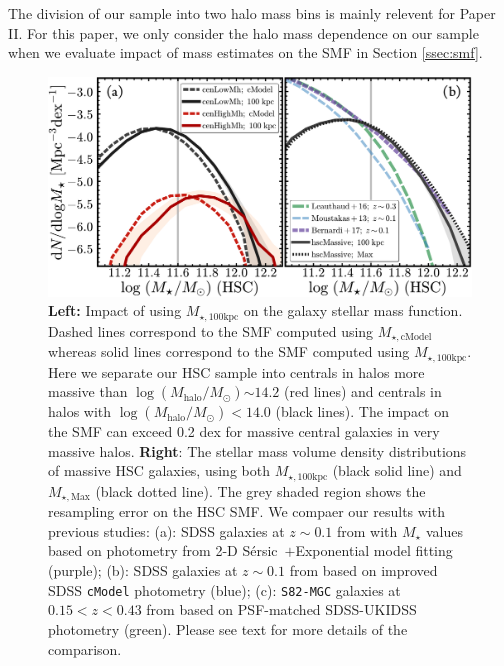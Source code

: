 \documentclass[a4paper,fleqn,usenatbib]{mnras}
\def\ser{{S\'{e}rsic\ }}
\def\mstar{{$M_{\star}$}}
\def\logmh{{$\log (M_{\mathrm{halo}}/M_{\odot})$}}
\def\mtot{{$M_{\star,100\mathrm{kpc}}$}}
\def\mmax{{$M_{\star,\mathrm{Max}}$}}
\def\mcmodel{{$M_{\star,\mathrm{cModel}}$}}
\begin{document}
    The  division of our sample into two halo mass bins is mainly relevent for Paper II.  For this paper, we only consider the halo mass dependence on our sample when we evaluate impact of  mass estimates on the SMF in Section \ref{ssec:smf}. 
  

  \begin{figure}
      \centering 
      \includegraphics[width=\textwidth]{fig/redbcg_mass_smf}
      \caption{
          \textbf{Left:} Impact of using \mtot{} on the galaxy stellar mass function. 
          Dashed lines correspond to the SMF computed using \mcmodel{} whereas solid 
          lines correspond to the SMF computed using \mtot{}. 
          Here we separate our HSC sample into  centrals in halos more massive than \logmh{}$\sim14.2$ (red lines) and centrals in 
          halos with \logmh{}$<14.0$ (black lines).
          The impact on the SMF can exceed 0.2 dex for massive central galaxies in 
          very massive halos.
          \textbf{Right}: The stellar mass volume density distributions of massive 
          HSC galaxies, using both \mtot{} (black solid line) and \mmax{} (black dotted 
          line).  The grey  shaded region shows the resampling error on the HSC SMF. We  compaer our results with previous studies: (a): SDSS galaxies at $z{\sim} 0.1$ from \citet{Bernardi2017} with \mstar{} values based on photometry from 2-D \ser{}$+$Exponential model fitting 
          (purple); 
          (b): SDSS galaxies at $z{\sim} 0.1$ from \citet{Moustakas13} based on 
          improved SDSS \texttt{cModel} photometry (blue); 
          (c): \texttt{S82-MGC} galaxies at $0.15 < z< 0.43$ from 
          \citet{Leauthaud2016} based on PSF-matched SDSS-UKIDSS photometry (green).
          Please see text for more details of the comparison.
          }
      \label{fig:smf}
  \end{figure}
\end{document}

